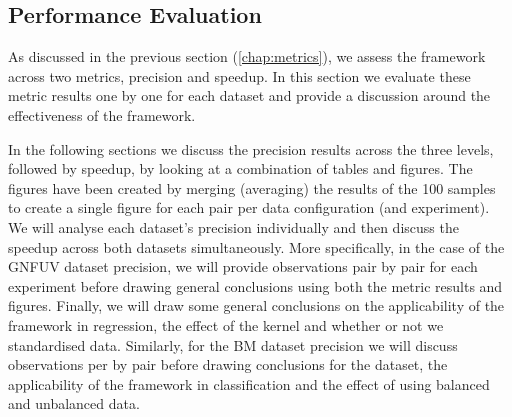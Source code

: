 \documentclass{mpaper}
\begin{document}
\subsection{Performance Evaluation}

As discussed in the previous section (\ref{chap:metrics}), we assess the framework across two metrics, precision and speedup. In this section we evaluate these metric results one by one for each dataset and provide a discussion around the effectiveness of the framework.

In the following sections we discuss the precision results across the three levels, followed by speedup, by looking at a combination of tables and figures. The figures have been created by merging (averaging) the results of the 100 samples to create a single figure for each pair per data configuration (and experiment). We will analyse each dataset's precision individually and then discuss the speedup across both datasets simultaneously. More specifically, in the case of the GNFUV dataset precision, we will provide observations pair by pair for each experiment before drawing general conclusions using both the metric results and figures. Finally, we will draw some general conclusions on the applicability of the framework in regression, the effect of the kernel and whether or not we standardised data. Similarly, for the BM dataset precision we will discuss observations per by pair before drawing conclusions for the dataset, the applicability of the framework in classification and the effect of using balanced and unbalanced data.
\end{document}
